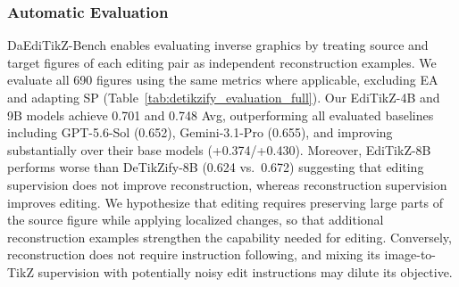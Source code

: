 \subsubsection{Automatic Evaluation}
\label{subsubsec:Automatic Evaluation}
DaEdiTikZ-Bench enables evaluating inverse graphics by treating source and target figures of each editing pair as independent reconstruction examples. We evaluate all 690 figures using the same metrics where applicable, excluding EA and adapting SP (Table~\ref{tab:detikzify_evaluation_full}). Our EdiTikZ-4B and 9B models achieve 0.701 and 0.748 Avg, outperforming all evaluated baselines including GPT-5.6-Sol (0.652), Gemini-3.1-Pro (0.655), and improving substantially over their base models (+0.374/+0.430). Moreover, EdiTikZ-8B performs worse than DeTikZify-8B (0.624 vs.\ 0.672) suggesting that editing supervision does not improve reconstruction, whereas reconstruction supervision improves editing. We hypothesize that editing requires preserving large parts of the source figure while applying localized changes, so that additional reconstruction examples strengthen the capability needed for editing. Conversely, reconstruction does not require instruction following, and mixing its image-to-TikZ supervision with potentially noisy edit instructions may dilute its objective.



